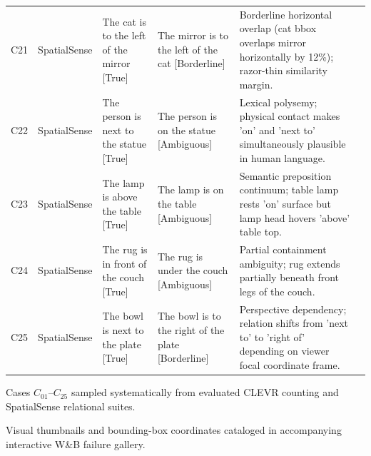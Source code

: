 \begin{table}[t]
\begin{tabular}{c l l p{3.2cm} p{3.2cm} p{4.8cm}}
C21 & SpatialSense & The cat is to the left of the mirror [True] & The mirror is to the left of the cat [Borderline] & Borderline horizontal overlap (cat bbox overlaps mirror horizontally by 12\%); razor-thin similarity margin. \\
C22 & SpatialSense & The person is next to the statue [True] & The person is on the statue [Ambiguous] & Lexical polysemy; physical contact makes 'on' and 'next to' simultaneously plausible in human language. \\
C23 & SpatialSense & The lamp is above the table [True] & The lamp is on the table [Ambiguous] & Semantic preposition continuum; table lamp rests 'on' surface but lamp head hovers 'above' table top. \\
C24 & SpatialSense & The rug is in front of the couch [True] & The rug is under the couch [Ambiguous] & Partial containment ambiguity; rug extends partially beneath front legs of the couch. \\
C25 & SpatialSense & The bowl is next to the plate [True] & The bowl is to the right of the plate [Borderline] & Perspective dependency; relation shifts from 'next to' to 'right of' depending on viewer focal coordinate frame. \\
\bottomrule
\end{tabular}
\begin{tablenotes}
\footnotesize
\item Cases $C_{01}\text{--}C_{25}$ sampled systematically from evaluated CLEVR counting and SpatialSense relational suites.
\item Visual thumbnails and bounding-box coordinates cataloged in accompanying interactive W\&B failure gallery.
\end{tablenotes}
\end{table}